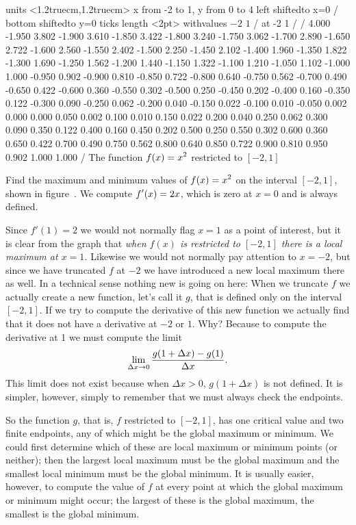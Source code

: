 \figure
\texonly
\vbox{\beginpicture
\normalgraphs
\ninepoint
\setcoordinatesystem units <1.2truecm,1.2truecm>
\setplotarea x from -2 to 1, y from 0 to 4
\axis left shiftedto x=0 /
\axis bottom shiftedto y=0 ticks length <2pt> withvalues {$-2$} {$1$} / at -2 1 / /
\setquadratic
{} 4.000 -1.950 3.802 -1.900 3.610 -1.850 3.422 -1.800 3.240 
-1.750 3.062 -1.700 2.890 -1.650 2.722 -1.600 2.560 -1.550 2.402 
-1.500 2.250 -1.450 2.102 -1.400 1.960 -1.350 1.822 -1.300 1.690 
-1.250 1.562 -1.200 1.440 -1.150 1.322 -1.100 1.210 -1.050 1.102 
-1.000 1.000 -0.950 0.902 -0.900 0.810 -0.850 0.722 -0.800 0.640 
-0.750 0.562 -0.700 0.490 -0.650 0.422 -0.600 0.360 -0.550 0.302 
-0.500 0.250 -0.450 0.202 -0.400 0.160 -0.350 0.122 -0.300 0.090 
-0.250 0.062 -0.200 0.040 -0.150 0.022 -0.100 0.010 -0.050 0.002 
0.000 0.000 0.050 0.002 0.100 0.010 0.150 0.022 0.200 0.040 
0.250 0.062 0.300 0.090 0.350 0.122 0.400 0.160 0.450 0.202 
0.500 0.250 0.550 0.302 0.600 0.360 0.650 0.422 0.700 0.490 
0.750 0.562 0.800 0.640 0.850 0.722 0.900 0.810 0.950 0.902 
1.000 1.000 /
\endpicture}
\endtexonly
{}
\begincaption
The function $\displaystyle f(x)=x^2$ restricted to $[-2,1]$
\endcaption
\endfigure

\example Find the maximum and minimum values of $\displaystyle f(x)=x^2$ on the
interval $[-2,1]$, shown in figure~.  We
compute $\displaystyle f'(x)=2x$, which is zero at $x=0$ and is always
defined. 

Since $f'(1)=2$ we would not normally flag $x=1$ as a point
of interest, but it is clear from the graph that {\em when $f(x)$ is
restricted to $[-2,1]$ there is a local maximum at $x=1$.} Likewise we
would not normally pay attention to $x=-2$, but since we have
truncated $f$ at $-2$ we have introduced a new local maximum there as
well. In a technical sense nothing new is going on here: When we
truncate $f$ we actually create a new function, let's call it $g$,
that is defined only on the interval $[-2,1]$. If we try to compute
the derivative of this new function we actually find that it does not
have a derivative at $-2$ or $1$. Why? Because to compute the
derivative at 1 we must compute the limit
$$\lim_{\Delta x\to 0} {g(1+\Delta x)-g(1)\over \Delta x}.$$
This limit does not exist because when $\Delta x>0$, 
$g(1+\Delta x)$ is not defined. It is simpler, however, simply to
remember that we must always check the endpoints.

So the function $g$, that is, $f$ restricted to $[-2,1]$, has one
critical value and two finite endpoints, any of which might be the
global maximum or minimum. We could first determine which of these are
local maximum or minimum points (or neither); then the largest local
maximum must be the global maximum and the smallest local minimum must
be the global minimum. It is usually easier, however, to compute the
value of $f$ at every point at which the global maximum or minimum
might occur; the largest of these is the global maximum, the smallest
is the global minimum.

